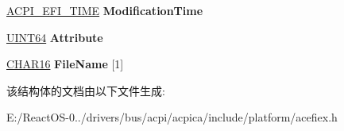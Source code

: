 \begin{DoxyCompactItemize}
\hyperlink{struct_a_c_p_i___e_f_i___t_i_m_e}{A\+C\+P\+I\+\_\+\+E\+F\+I\+\_\+\+T\+I\+ME} {\bfseries Modification\+Time}
\item 
\mbox{\label{struct_a_c_p_i___e_f_i___f_i_l_e___i_n_f_o_aa2c94e3944e5f0a38c3c1f5cdc8b6290}} 
\hyperlink{_processor_bind_8h_a57be03562867144161c1bfee95ca8f7c}{U\+I\+N\+T64} {\bfseries Attribute}
\item 
\mbox{\label{struct_a_c_p_i___e_f_i___f_i_l_e___i_n_f_o_a8f330c57d035c07e08609342a7c5f0de}} 
\hyperlink{_processor_bind_8h_a7ae886893bd2a2ae253eb2b021a48724}{C\+H\+A\+R16} {\bfseries File\+Name} \mbox{[}1\mbox{]}
\end{DoxyCompactItemize}


该结构体的文档由以下文件生成\+:\begin{DoxyCompactItemize}
\item 
E\+:/\+React\+O\+S-\/0../drivers/bus/acpi/acpica/include/platform/acefiex.\+h\end{DoxyCompactItemize}
